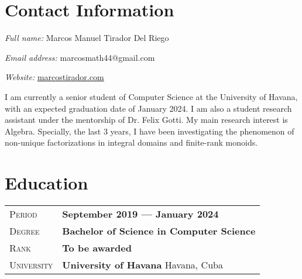 \documentclass[12pt]{amsart}
\theoremstyle{definition}
\numberwithin{equation}{section}
\newcommand{\gray}{\rowcolor[gray]{.90}} %
\begin{document}
	
	
	
%	
%	
	
		

\date{\today}

	

\section{Contact Information}
	\textit{Full name:} Marcos Manuel Tirador Del Riego
	
	\textit{Email address:} marcosmath44@gmail.com
	
	\textit{Website:} \href{marcostirador.com}{marcostirador.com}
	
	\vspace{0.5cm}
	
	I am currently a senior student of Computer Science at the University of Havana, with an expected graduation date of January 2024. I am also a student research assistant under the mentorship of Dr. Felix Gotti. My main research interest is Algebra. Specially, the last 3 years, I have been investigating the phenomenon of non-unique factorizations in integral domains and finite-rank monoids.
	
\section{Education}

	\begin{tabularx}{0.97\linewidth}{>{\raggedleft\scshape}p{2cm}X}
	\gray Period & \textbf{September 2019 --- January 2024}\\
	\gray Degree & \textbf{Bachelor of Science in Computer Science}\\
	\gray Rank & \textbf{To be awarded}\\
	\gray University & \textbf{University of Havana} \hfill Havana, Cuba\\
	\end{tabularx}
	
\end{document}
